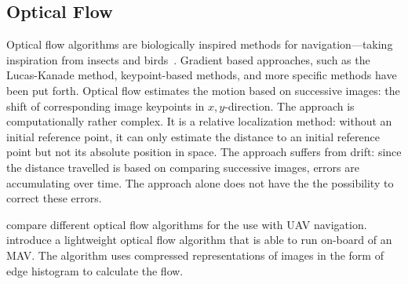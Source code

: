 
\subsection{Optical Flow}
\label{sec:opticalflow}

Optical flow algorithms are biologically inspired methods for navigation---taking inspiration from insects and birds~\cite{ruffier2003bio}. Gradient based approaches, such as the Lucas-Kanade method, keypoint-based methods, and more specific methods have been put forth.  
Optical flow estimates the motion based on successive images: the shift of corresponding image keypoints in $x,y$-direction.
The approach is computationally rather complex. It is a relative localization method: without an initial reference point, it can only estimate the distance to an initial reference point but not its absolute position in space. The approach suffers from drift: since the distance travelled is based on comparing successive images, errors are accumulating over time. The approach alone does not have the  the possibility to correct these errors.

\citet{chao2013survey} compare different optical flow algorithms for the use with UAV navigation. \citet{mcguire2016local} introduce a lightweight optical flow algorithm that is able to run on-board of an MAV. The algorithm uses compressed representations of images in the form of edge histogram to calculate the flow.   